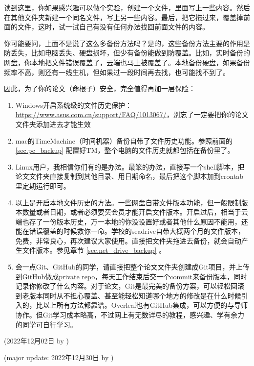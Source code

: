 读到这里，你如果感兴趣可以做个实验，创建一个文件，里面写上一些内容。然后在其他文件夹新建一个同名文件，写上另一些内容。最后，把它拖过来，覆盖掉前面的文件，这时，试一试自己有没有任何办法找回前面文件的内容。

你可能要问，上面不是说了这么多备份方法吗？是的，这些备份方法主要的作用是防丢失，比如电脑丢失、硬盘损坏，但少有备份能做到防覆盖。比如，实时备份的网盘，你本地把文件错误覆盖了，云端也马上被覆盖了。本地备份硬盘，如果备份频率不高，则还有一线生机，但如果过一段时间再去找，也可能找不到了。

因此，为了你的论文（命根子）安全，完全值得再加一层保险：

\begin{enumerate}
    \item Windows开启系统级的文件历史保护：\url{https://www.asus.com.cn/support/FAQ/1013067/}，别忘了一定要把你的论文文件夹添加进去才能生效
    \item mac的TimeMachine（时间机器）备份自带了文件历史功能。参照前面的 \ref{sec.pc_backup} 配置好TM，整个电脑的文件历史就都包括在备份里了。
    \item Linux用户，我相信你们有的是办法。最笨的办法，直接写一个shell脚本，把论文文件夹直接复制到其他目录、用日期命名，最后把这个脚本加到crontab里定期运行即可。
    \item 以上是开启本地文件历史的方法。一些网盘自带文件版本功能，但一般限制版本数量或者日期，或者必须要买会员才能开启文件版本。开启过后，相当于云端也存了一份版本历史，万一本地的你没设置好或者其他什么原因不能用，还能在错误覆盖的时候救你一命。学校的seadrive自带大概两个月的文件版本，免费，非常良心，再次建议大家使用。直接把文件夹拖进去备份，就会自动产生文件版本。参见章节 \ref{sec.net_drive_backup} 。
    \item 会一点Git、GitHub的同学，请直接把整个论文文件夹创建成Git项目，并上传到GitHub做成private repo，每天工作结束后交一个commit来备份版本，同时记录你修改了什么内容。对于论文，Git是最完美的备份方案，可以轻松回滚到老版本同时从不担心覆盖、甚至能轻松知道哪个地方的修改是在什么时候引入的，比以上所有方法都靠谱。Overleaf也有GitHub集成，可以方便的与导师协作。但Git学习成本略高，不过网上有无数详尽的教程，感兴趣、学有余力的同学可自行学习。
\end{enumerate}


\begin{flushright}
(2022年12月02日 by \Wu)

(major update: 2022年12月30日 by \Wu)
\end{flushright}





% 
